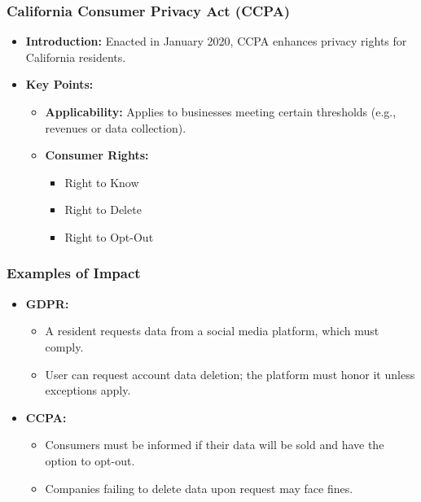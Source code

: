 \documentclass{beamer}
\begin{document}
\begin{frame}[fragile]
    \frametitle{California Consumer Privacy Act (CCPA)}
    \begin{itemize}
        \item \textbf{Introduction:} Enacted in January 2020, CCPA enhances privacy rights for California residents.
        \item \textbf{Key Points:}
        \begin{itemize}
            \item \textbf{Applicability:} Applies to businesses meeting certain thresholds (e.g., revenues or data collection).
            \item \textbf{Consumer Rights:}
            \begin{itemize}
                \item Right to Know
                \item Right to Delete
                \item Right to Opt-Out
            \end{itemize}
        \end{itemize}
    \end{itemize}
\end{frame}

\begin{frame}[fragile]
    \frametitle{Examples of Impact}
    \begin{itemize}
        \item \textbf{GDPR:}
        \begin{itemize}
            \item A resident requests data from a social media platform, which must comply.
            \item User can request account data deletion; the platform must honor it unless exceptions apply.
        \end{itemize}
        \item \textbf{CCPA:}
        \begin{itemize}
            \item Consumers must be informed if their data will be sold and have the option to opt-out.
            \item Companies failing to delete data upon request may face fines.
        \end{itemize}
    \end{itemize}
\end{frame}
\end{document}
